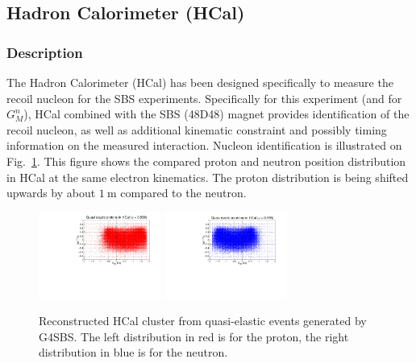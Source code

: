 \subsection{Hadron Calorimeter (HCal)}\label{sec:expsetup_hcal}

\subsubsection{Description}

The Hadron Calorimeter (HCal) has been designed specifically to measure the recoil nucleon for the SBS experiments. Specifically for this experiment (and for $G_M^n$), HCal combined with the SBS (48D48) magnet provides identification of the recoil nucleon, as well as additional kinematic constraint and possibly timing information on the measured interaction.
Nucleon identification is illustrated on Fig.~\ref{fig:hcal_nuclimprint}. This figure shows the compared proton and neutron position distribution in HCal at the same electron kinematics. The proton distribution is being shifted upwards by about $1~\mathrm{m}$ compared to the neutron.

\begin{figure}[!h]
  \centering
    \includegraphics[angle=90,width=4cm]{Plots/HCal_p.pdf}
    \includegraphics[angle=90,width=4cm]{Plots/HCal_n.pdf}
    \caption{Reconstructed HCal cluster from quasi-elastic events generated by G4SBS. The left distribution in red is for the proton, the right distribution in blue is for the neutron.}
    \label{fig:hcal_nuclimprint}
\end{figure}

